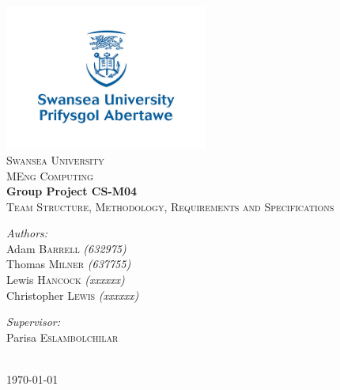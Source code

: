 \begin{titlepage}

\begin{center}
\includegraphics[width=0.5\textwidth]{img/University_Logo}\\

\textsc{\LARGE Swansea University }\\[0.5cm]
\textsc{\large MEng Computing }\\[2cm]

{ \huge \bfseries Group Project CS-M04}\\[0.2cm]
\textsc{\large Team Structure, Methodology, Requirements and Specifications}\\[1.5cm]

\begin{minipage}{0.4\textwidth}
\begin{flushleft}

\emph{Authors:}\\
Adam \textsc{Barrell} {\scriptsize \emph{(632975)}} \\
Thomas \textsc{Milner} {\scriptsize \emph{(637755)}} \\
Lewis \textsc{Hancock} {\scriptsize \emph{(xxxxxx)}} \\
Christopher \textsc{Lewis} {\scriptsize \emph{(xxxxxx)}} \\

\end{flushleft}
\end{minipage}
\begin{minipage}{0.4\textwidth}
\begin{flushright}

\emph{Supervisor:}\\
Parisa \textsc{Eslambolchilar}

\end{flushright}
\end{minipage}\\[1.3cm]

{\today}
\end{center}

\end{titlepage}